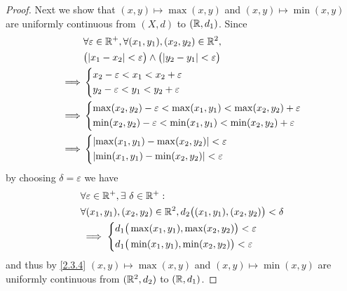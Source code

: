 \begin{proof}
  Next we show that \((x, y) \mapsto \max(x, y)\) and \((x, y) \mapsto \min(x, y)\) are uniformly continuous from \((X, d)\) to \((\mathbb{R}, d_1)\).
  Since
  \begin{align*}
             & \forall \varepsilon \in \R^+, \forall (x_1, y_1), (x_2, y_2) \in \R^2,                \\
             & \big(\abs{x_1 - x_2} < \varepsilon\big) \land \big(\abs{y_2 - y_1} < \varepsilon\big) \\
    \implies & \begin{dcases}
                 x_2 - \varepsilon < x_1 < x_2 + \varepsilon \\
                 y_2 - \varepsilon < y_1 < y_2 + \varepsilon \\
               \end{dcases}                                           \\
    \implies & \begin{dcases}
                 \max(x_2, y_2) - \varepsilon < \max(x_1, y_1) < \max(x_2, y_2) + \varepsilon \\
                 \min(x_2, y_2) - \varepsilon < \min(x_1, y_1) < \min(x_2, y_2) + \varepsilon
               \end{dcases}          \\
    \implies & \begin{dcases}
                 \abs{\max(x_1, y_1) - \max(x_2, y_2)} < \varepsilon \\
                 \abs{\min(x_1, y_1) - \min(x_2, y_2)} < \varepsilon
               \end{dcases}
  \end{align*}
  by choosing \(\delta = \varepsilon\) we have
  \begin{align*}
     & \forall \varepsilon \in \mathbb{R}^+, \exists\ \delta \in \mathbb{R}^+ :                              \\
     & \forall (x_1, y_1), (x_2, y_2) \in \mathbb{R}^2, d_2\big((x_1, y_1), (x_2, y_2)\big) < \delta \\
     & \implies \begin{dcases}
                  d_1\big(\max(x_1, y_1), \max(x_2, y_2)\big) < \varepsilon \\
                  d_1\big(\min(x_1, y_1), \min(x_2, y_2)\big) < \varepsilon
                \end{dcases}
  \end{align*}
  and thus by \cref{2.3.4} \((x, y) \mapsto \max(x, y)\) and \((x, y) \mapsto \min(x, y)\) are uniformly continuous from \((\mathbb{R}^2, d_2)\) to \((\mathbb{R}, d_1)\).


\end{proof}
